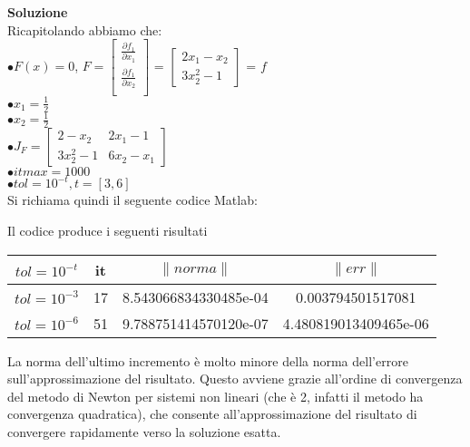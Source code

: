 \large\noindent{}
\begin{flushleft}
	\large \textbf{Soluzione}\\[0.5cm]
	Ricapitolando abbiamo che:\\[0.5cm]
	$\bullet F(x) = 0$, \space $F = \begin{bmatrix}
		\frac{\partial f_{1}}{\partial x_{1}}\\[0.2cm]
		\frac{\partial f_{1}}{\partial x_{2}}\\[0.2cm]
		\end{bmatrix}$ = $\begin{bmatrix}
		2x_{1} - x_{2}\\
		3x_{2}^{2} - 1
		\end{bmatrix}$ = $f$\\[0.2cm]
	$\bullet x_{1} = \frac{1}{2}$\\[0.2cm]
	$\bullet x_{2} = \frac{1}{2}$\\[0.2cm]
	$\bullet J_{F} = \begin{bmatrix}
		2-x_{2} & 2x_{1} -1\\
		3x_{2}^{2}-1 & 6x_{2} - x_{1} \end{bmatrix}$\\[0.2cm]
	$\bullet itmax = 1000$\\[0.2cm]
	$\bullet tol = 10^{-t}, t = [3,6]$\\[0.2cm]
	Si richiama quindi il seguente codice Matlab:
	
	Il codice produce i seguenti risultati
	\begin{center}
	\begin{tabular}{| c | c | c | c |}
		\hline
			$tol = 10^{-t}$ & it & $\|norma\|$ & $\| err \|$\\
		\hline
			$tol = 10^{-3}$ & 17 & 8.543066834330485e-04 & 0.003794501517081\\
			$tol = 10^{-6}$ & 51 & 9.788751414570120e-07 & 4.480819013409465e-06\\
			\hline
			\end{tabular}
			\end{center}
	\end{flushleft}
La norma dell'ultimo incremento è molto minore della norma dell'errore sull'approssimazione del risultato. Questo avviene grazie all'ordine di convergenza del metodo di Newton per sistemi non lineari (che è 2, infatti il metodo ha convergenza quadratica), che consente all'approssimazione del risultato di convergere rapidamente verso la soluzione esatta.